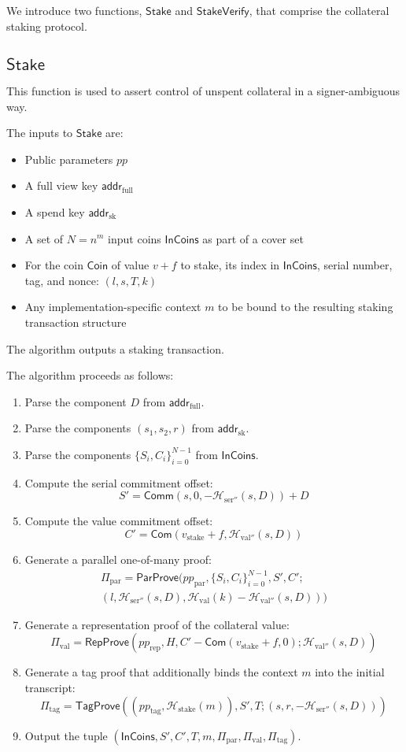 \documentclass{article}
\newcommand{\func}[1]{\mathsf{#1}}
\newcommand{\com}{\func{Com}}
\newcommand{\comm}{\func{Comm}}
\newcommand{\addr}{\func{addr}}
\newcommand{\hash}{\mathcal{H}}
\theoremstyle{remark}
\begin{document}
We introduce two functions, $\func{Stake}$ and $\func{StakeVerify}$, that comprise the collateral staking protocol.


\subsection{\texorpdfstring{$\func{Stake}$}{Stake}}

This function is used to assert control of unspent collateral in a signer-ambiguous way.

The inputs to $\func{Stake}$ are:
\begin{itemize}
    \item Public parameters $pp$
    \item A full view key $\addr_{\text{full}}$
    \item A spend key $\addr_{\text{sk}}$
    \item A set of $N = n^m$ input coins $\func{InCoins}$ as part of a cover set
    \item For the coin $\func{Coin}$ of value $v + f$ to stake, its index in $\func{InCoins}$, serial number, tag, and nonce: $(l,s,T,k)$
    \item Any implementation-specific context $m$ to be bound to the resulting staking transaction structure
\end{itemize}
The algorithm outputs a staking transaction.

The algorithm proceeds as follows:
\begin{enumerate}
    \item Parse the component $D$ from $\addr_{\text{full}}$.
    \item Parse the components $(s_1,s_2,r)$ from $\addr_{\text{sk}}$.
    \item Parse the components $\{S_i,C_i\}_{i=0}^{N-1}$ from $\func{InCoins}$.
    \item Compute the serial commitment offset: $$S' = \comm(s,0,-\hash_{\text{ser}''}(s,D)) + D$$
    \item Compute the value commitment offset: $$C' = \com(v_{\text{stake}} + f,\hash_{\text{val}''}(s,D))$$
    \item Generate a parallel one-of-many proof:
    \begin{multline*}
        \Pi_{\text{par}} = \func{ParProve}(pp_{\text{par}},\{S_i,C_i\}_{i=0}^{N-1},S',C' ; \\
        (l,\hash_{\text{ser}''}(s,D),\hash_{\text{val}}(k) - \hash_{\text{val}''}(s,D)))
    \end{multline*}
    \item Generate a representation proof of the collateral value: $$\Pi_{\text{val}} = \func{RepProve}(pp_{\text{rep}},H,C'-\com(v_{\text{stake}} + f,0) ; \hash_{\text{val}''}(s,D))$$
    \item Generate a tag proof that additionally binds the context $m$ into the initial transcript: $$\Pi_{\text{tag}} = \func{TagProve}((pp_{\text{tag}},\hash_{\text{stake}}(m)),S',T ; (s,r,-\hash_{\text{ser}''}(s,D)))$$
    \item Output the tuple $(\func{InCoins},S',C',T,m,\Pi_{\text{par}},\Pi_{\text{val}},\Pi_{\text{tag}})$.
\end{enumerate}
\end{document}
